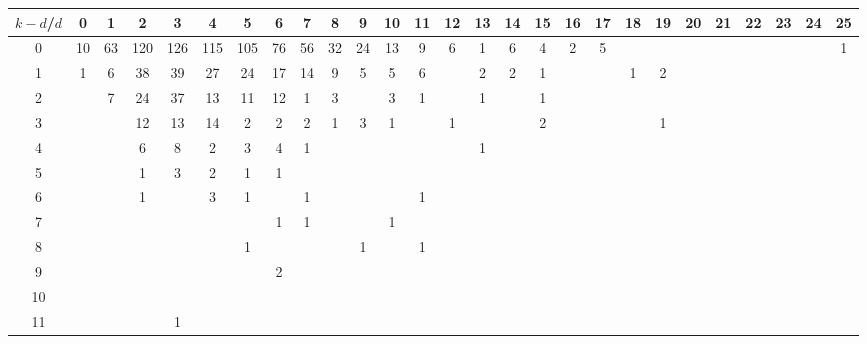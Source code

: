 \documentclass{article}[12pt]
\begin{document}
\begin{landscape}

\begin{table}[h]\footnotesize
{\centering
\begin{tabular}{|c|c|
c|c|c|c|c|c|c|c|c|c|c|c|c|c|c|c|c|c|c|c|c|c|c|c|c|}
  \hline
  $k-d$/$d$ 
 & 0 & 1 & 2 & 3 & 4 & 5 & 6 & 7 & 8 & 9 & 10 & 11 & 12 & 13 & 14 & 15 & 16 & 17 & 18 & 19 & 20 & 21 & 22 & 23 & 24 & 25\\

  \hline
  \hline

0  & 10 & 63 & 120 & 126 & 115 & 105 & 76 & 56 & 32 & 24 & 13 & 9 & 6 & 1 & 6 & 4 & 2 & 5 &  &  &  &  &  &  &  & 1\\

1  & 1 & 6 & 38 & 39 & 27 & 24 & 17 & 14 & 9 & 5 & 5 & 6 &  & 2 & 2 & 1 &  &  & 1 & 2 &  &  &  &  &  & \\

2  &  & 7 & 24 & 37 & 13 & 11 & 12 & 1 & 3 &  & 3 & 1 &  & 1 &  & 1 &  &  &  &  &  &  &  &  &  & \\

3  &  &  & 12 & 13 & 14 & 2 & 2 & 2 & 1 & 3 & 1 &  & 1 &  &  & 2 &  &  &  & 1 &  &  &  &  &  & \\

4  &  &  & 6 & 8 & 2 & 3 & 4 & 1 &  &  &  &  &  & 1 &  &  &  &  &  &  &  &  &  &  &  & \\

5  &  &  & 1 & 3 & 2 & 1 & 1 &  &  &  &  &  &  &  &  &  &  &  &  &  &  &  &  &  &  & \\

6  &  &  & 1 &  & 3 & 1 &  & 1 &  &  &  & 1 &  &  &  &  &  &  &  &  &  &  &  &  &  & \\

7  &  &  &  &  &  &  & 1 & 1 &  &  & 1 &  &  &  &  &  &  &  &  &  &  &  &  &  &  & \\

8  &  &  &  &  &  & 1 &  &  &  & 1 &  & 1 &  &  &  &  &  &  &  &  &  &  &  &  &  & \\

9  &  &  &  &  &  &  & 2 &  &  &  &  &  &  &  &  &  &  &  &  &  &  &  &  &  &  & \\

10  &  &  &  &  &  &  &  &  &  &  &  &  &  &  &  &  &  &  &  &  &  &  &  &  &  & \\

11  &  &  &  & 1 &  &  &  &  &  &  &  &  &  &  &  &  &  &  &  &  &  &  &  &  &  & \\


\end{tabular}}
\end{table}
\end{landscape}
\end{document}
